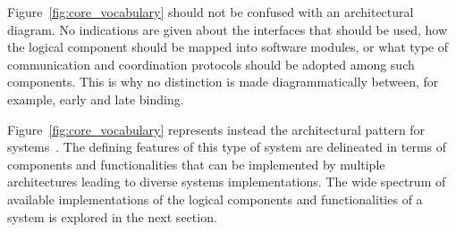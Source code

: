 \documentclass{sig-alternate}
\begin{document}

Figure~\ref{fig:core_vocabulary} should not be confused with an architectural
diagram. No indications are given about the interfaces that should be used, how
the logical component should be mapped into software modules, or what type of
communication and coordination protocols should be adopted among such
components. This is why no distinction is made diagrammatically between, for
example, early and late binding.

Figure~\ref{fig:core_vocabulary} represents instead the architectural pattern
for \pilot systems~\cite{buschmann2007pattern}. The defining features of this
type of system are delineated in terms of components and functionalities that
can be implemented by multiple architectures leading to diverse \pilot systems
implementations. The wide spectrum of available implementations of the logical
components and functionalities of a \pilot system is explored in the next
section.





\end{document}
